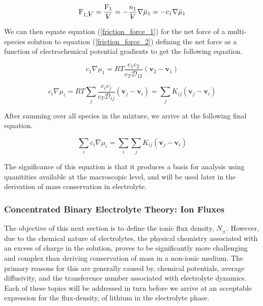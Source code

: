 \documentclass[lettersize,journal]{IEEEtran}
\newcommand{\volume}{{\ooalign{\hfil$V$\hfil\cr\kern0.08em--\hfil\cr}}}
\begin{document}
\begin{equation}\label{friction_force_2}
  \mathrm{F}_{1, \volume}=\frac{\mathrm{F}_{1}}{\volume}=-\frac{n_{1}}{\volume} \nabla \bar{\mu}_{1}=-c_{1} \nabla \bar{\mu}_{1}
\end{equation}

We can then equate equation (\ref{friction_force_1}) for the net force of a multi-species solution to equation (\ref{friction_force_2}) defining the net force as a function of electrochemical potential gradients to get the following equation.

\begin{equation}
  c_{1} \nabla \mu_{1}=R T \frac{c_{1} c_{2}}{c_{T} \mathscr{D}_{12}}\left(\mathbf{v}_{2}-\mathbf{v}_{1}\right)
\end{equation}

\begin{equation}
  c_{i} \nabla \mu_{i}=R T \sum_{j} \frac{c_{i} c_{j}}{c_{T} \mathscr{D}_{i j}}\left(\mathbf{v}_{j}-\mathbf{v}_{i}\right)=\sum_{j} K_{i j}\left(\mathbf{v}_{j}-\mathbf{v}_{i}\right)
\end{equation}

After summing over all species in the mixture, we arrive at the following final equation.

\begin{equation}\label{mulit_component_mixture_friction}
  \sum_{i} c_{i} \nabla \mu_{i}=\sum_{i} \sum_{j} K_{i j}\left(\mathbf{v}_{j}-\mathbf{v}_{i}\right)
\end{equation}

The significance of this equation is that it produces a basis for analysis using quanitities available at the macroscopic level, and will be used later in the derivation of mass conservation in electrolyte.\\

\subsubsection{Concentrated Binary Electrolyte Theory: Ion Fluxes}

The objective of this next section is to define the ionic flux density, $N_{\pm}$. However, due to the chemical nature of electrolytes, the physical chemistry associated with an excess of charge in the solution, proves to be significantly more challenging and complex than deriving conservation of mass in a non-ionic medium. The primary reasons for this are generally caused by, chemical potentials, average diffusivity, and the transference number associated with electrolyte dynamics. Each of these topics will be addressed in turn before we arrive at an acceptable expression for the flux-density, of lithium in the electrolyte phase. \\
\end{document}
